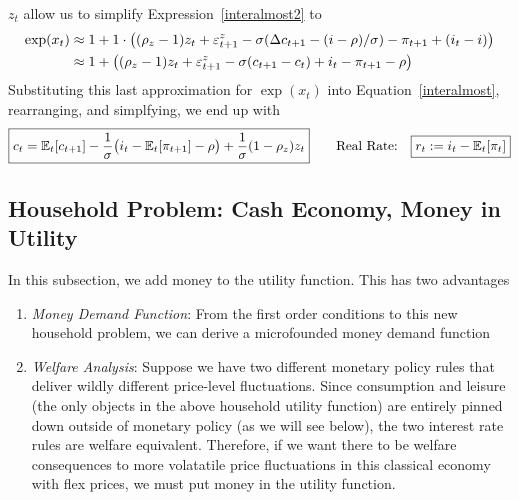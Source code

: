 \documentclass[12pt]{article}
\theoremstyle{plain}
\theoremstyle{definition}
\theoremstyle{remark}
\newcommand{\E}{\mathbb{E}}
\begin{document}
\begin{itemize}
    $z_t$ allow us to simplify Expression~\ref{interalmost2} to
    \begin{align}
      \exp(x_t)
      &\approx 1 + 1\cdot\big(
        (\rho_z-1)z_t+\varepsilon_{t+1}^z
        -\sigma (\Delta c_{t+1}-(i-\rho)/\sigma)
        - \pi_{t+1}
        + (i_t-i)
      \big)
      \notag
      \\
      &\approx 1 + \big(
        (\rho_z-1)z_t+\varepsilon_{t+1}^z
        -\sigma (c_{t+1}-c_t)
        + i_t
        - \pi_{t+1}
        - \rho
      \big)
      \label{interalmost3}
    \end{align}
    Substituting this last approximation for $\exp(x_t)$ into
    Equation~\ref{interalmost}, rearranging, and simplfying, we end up
    with
    \begin{align*}
      \boxed{%
      c_{t}
      =
      \E_t[c_{t+1}]
      -
      \frac{1}{\sigma}
      \big(
      i_t-\E_t[\pi_{t+1}]
      -\rho
      \big)
      +
      \frac{1}{\sigma}
      (1-\rho_z) z_t
      }
      \qquad\text{Real Rate:}\quad
      \boxed{ r_t:=i_t-\E_t[\pi_t] }
    \end{align*}
\end{itemize}

\clearpage
\subsection{Household Problem: Cash Economy, Money in Utility}

In this subsection, we add money to the utility function. This has two
advantages
\begin{enumerate}[label=(\roman*)]
  \item \emph{Money Demand Function}:
    From the first order conditions to this new household problem,
    we can derive a microfounded money demand function
  \item \emph{Welfare Analysis}:
    Suppose we have two different monetary policy rules that deliver
    wildly different price-level fluctuations.
    Since consumption and leisure (the only objects in the above
    household utility function) are entirely pinned down outside of
    monetary policy (as we will see below), the two interest rate rules
    are welfare equivalent.
    Therefore, if we want there to be welfare consequences to
    more volatatile price fluctuations in this classical economy with
    flex prices, we must put money in the utility function.

\end{enumerate}
\end{document}
